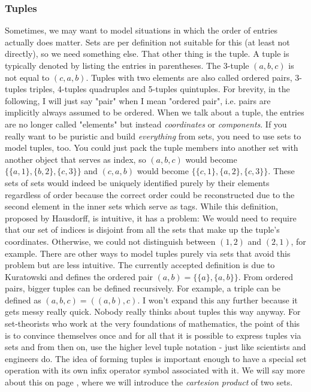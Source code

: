 


\subsubsection{Tuples}
Sometimes, we may want to model situations in which the order of entries actually does matter. Sets are per definition not suitable for this (at least not directly), so we need something else. That other thing is the tuple. A tuple is typically denoted by listing the entries in parentheses. The 3-tuple $(a,b,c)$ is not equal to $(c,a,b)$. Tuples with two elements are also called ordered pairs, 3-tuples triples, 4-tuples quadruples and 5-tuples quintuples. For brevity, in the following, I will just say "pair" when I mean "ordered pair", i.e. pairs are implicitly always assumed to be ordered. When we talk about a tuple, the entries are no longer called "elements" but instead \emph{coordinates} or \emph{components}. If you really want to be puristic and build \emph{everything} from sets, you need to use sets to model tuples, too. You could just pack the tuple members into another set with another object that serves as index, so $(a,b,c)$ would become $\{\{a,1\},\{b,2\},\{c,3\}\}$ and $(c,a,b)$ would become  $\{\{c,1\},\{a,2\},\{c,3\}\}$. These sets of sets would indeed be uniquely identified purely by their elements regardless of order because the correct order could be reconstructed due to the second element in the inner sets which serve as tags. While this definition, proposed by Hausdorff, is intuitive, it has a problem: We would need to require that our set of indices is disjoint from all the sets that make up the tuple's coordinates. Otherwise, we could not distinguish between $(1,2)$ and $(2,1)$, for example. There are other ways to model tuples purely via sets that avoid this problem but are less intuitive. The currently accepted definition is due to Kuratowski and defines the ordered pair $(a,b) = \{ \{a\}, \{a,b\} \}$. From ordered pairs, bigger tuples can be defined recursively. For example, a triple can be defined as $(a,b,c) = ((a,b),c)$. I won't expand this any further because it gets messy really quick. Nobody really thinks about tuples this way anyway. For set-theorists who work at the very foundations of mathematics, the point of this is to convince themselves once and for all that it is possible to express tuples via sets and from then on, use the higher level tuple notation - just like scientists and engineers do. The idea of forming tuples is important enough to have a special set operation with its own infix operator symbol associated with it. We will say more about this on page \pageref{Par:SetAlgebra}, where we will introduce the \emph{cartesion product} of two sets.

